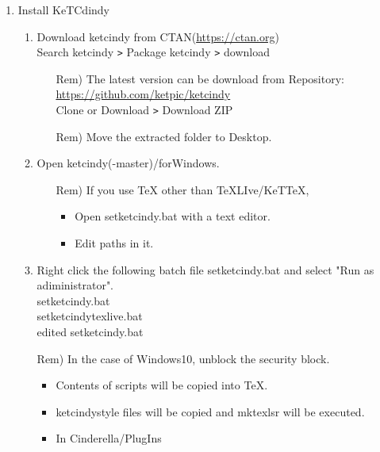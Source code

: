\documentclass{article}
\begin{document}
\begin{enumerate}[\bf\large 1.]
\item Install KeTCdindy
  \begin{enumerate}[(1)]
  \item Download ketcindy from CTAN(\url{https://ctan.org})\\
  \hspace*{10mm}Search ketcindy \verb|>| Pack­age ketcindy \verb|>| download
    \begin{itemize}
    \item[Rem)]The latest version can be download from Repository:\\
        \hspace*{5mm}\url{https://github.com/ket­pic/ketcindy}\\
        \hspace*{10mm}Clone or Download \verb|>| Download ZIP
    \item[Rem)]Move the extracted folder to Desktop.
    \end{itemize}
  \item Open ketcindy(-master)/forWindows.
    \begin{itemize}
   \item[Rem)]If you use TeX other than TeXLIve/KeTTeX,
      \begin{itemize}
      \item Open setketcindy.bat with a text editor.
      \item Edit paths in it.
      \end{itemize}
    \end{itemize}
  \item Right click the following batch file setketcindy.bat and select "Run as adiministrator".\\
  \hspace*{10mm} setketcindy.bat\\
  \hspace*{10mm} setketcindytexlive.bat\\
  \hspace*{10mm} edited setketcindy.bat
   \item[Rem)]In the case of Windows10, unblock the security block.    \begin{itemize}
    \item Contents of scripts will be copied into TeX.
    \item ketcindystyle files will be copied and mktexlsr will be executed.
    \item In Cinderella/PlugIns\\

\end{itemize}
\end{enumerate}
\end{enumerate}
\end{document}
